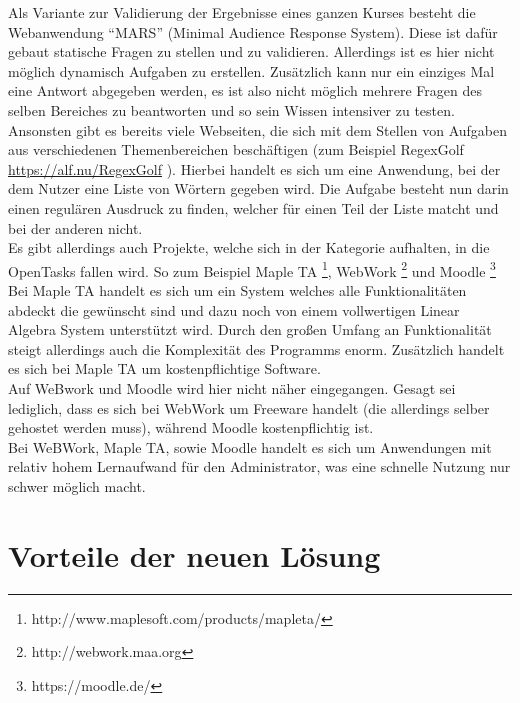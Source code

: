 Als Variante zur Validierung der Ergebnisse eines ganzen Kurses besteht die Webanwendung ``MARS'' (Minimal Audience Response System). Diese ist dafür gebaut statische Fragen zu stellen und zu validieren. Allerdings ist es hier nicht möglich dynamisch Aufgaben zu erstellen. Zusätzlich kann nur ein einziges Mal eine Antwort abgegeben werden, es ist also nicht möglich mehrere Fragen des selben Bereiches zu beantworten und so sein Wissen intensiver zu testen. \\

Ansonsten gibt es bereits viele Webseiten, die sich mit dem Stellen von Aufgaben aus verschiedenen Themenbereichen beschäftigen (zum Beispiel RegexGolf \url{https://alf.nu/RegexGolf} ). Hierbei handelt es sich um eine Anwendung, bei der dem Nutzer eine Liste von Wörtern gegeben wird. Die Aufgabe besteht nun darin einen regulären Ausdruck zu finden, welcher für einen Teil der Liste matcht und bei der anderen nicht. \\

Es gibt allerdings auch Projekte, welche sich in der Kategorie aufhalten, in die OpenTasks fallen wird. So zum Beispiel Maple TA \footnote{http://www.maplesoft.com/products/mapleta/}, WebWork \footnote{http://webwork.maa.org} und Moodle \footnote{https://moodle.de/} \\
Bei Maple TA handelt es sich um ein System welches alle Funktionalitäten abdeckt die gewünscht sind und dazu noch von einem vollwertigen Linear Algebra System unterstützt wird. Durch den großen Umfang an Funktionalität steigt allerdings auch die Komplexität des Programms enorm. Zusätzlich handelt es sich bei Maple TA um kostenpflichtige Software.\\
Auf WeBwork und Moodle wird hier nicht näher eingegangen. Gesagt sei lediglich, dass es sich bei WebWork um Freeware handelt (die allerdings selber gehostet werden muss), während Moodle kostenpflichtig ist. \\
Bei WeBWork, Maple TA, sowie Moodle handelt es sich um Anwendungen mit relativ hohem Lernaufwand für den Administrator, was eine schnelle Nutzung nur schwer möglich macht.


\section{Vorteile der neuen Lösung}

